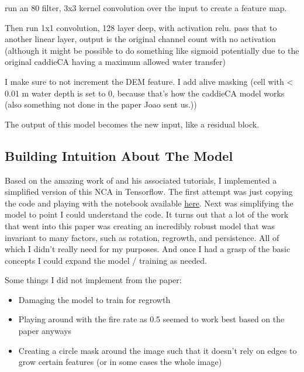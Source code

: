 run an 80 filter, 3x3 kernel convolution over the input to create a feature map.

Then run 1x1 convolution, 128 layer deep, with activation relu.
pass that to another linear layer, output is the original channel count with no activation (although it might be possible to do something like sigmoid potentially due to the original caddieCA having a maximum allowed water transfer)

I make sure to not increment the DEM feature. I add alive masking (cell with \textless{} {0.01} m water depth is set to 0, because that's how the caddieCA model works (also something not done in the paper Joao sent us.))

The output of this model  becomes the new input, like a residual block.

\subsection{Building Intuition About The Model}

Based on the amazing work of \cite[A. Mordvintesev et al.]{growing_nca} and his associated tutorials, I implemented a simplified version of this NCA in Tensorflow. The first attempt was just copying the code and playing with the notebook available \href{https://colab.research.google.com/github/google-research/self-organising-systems/blob/master/notebooks/growing_ca.ipynb}{here}. Next was simplifying the model to point I could understand the code. It turns out that a lot of the work that went into this paper was creating an incredibly robust model that was invariant to many factors, such as rotation, regrowth, and persistence. All of which I didn't really need for my purposes. And once I had a grasp of the basic concepts I could expand the model / training as needed.

Some things I did not implement from the paper:
\begin{itemize}
	\item Damaging the model to train for regrowth
	\item Playing around with the fire rate as 0.5 seemed to work best based on the paper anyways
	\item Creating a circle mask around the image such that it doesn't rely on edges to grow certain features (or in some cases the whole image)
\end{itemize}

